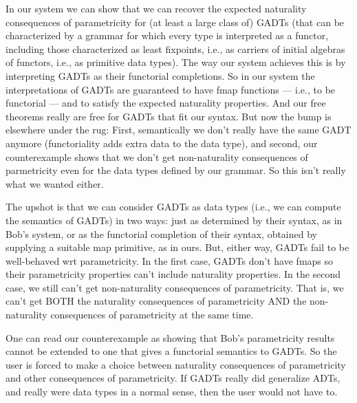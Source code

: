 \documentclass[acmsmall,screen,review,anonymous]{acmart}
\theoremstyle{definition}
\begin{document}
In our system we can show that we can recover the expected naturality
consequences of parametricity for (at least a large class of) GADTs
(that can be characterized by a grammar for which every type is
interpreted as a functor, including those characterized as least
fixpoints, i.e., as carriers of initial algebras of functors, i.e., as
primitive data types). The way our system achieves this is by
interpreting GADTs as their functorial completions. So in our system
the interpretations of GADTs are guaranteed to have fmap functions ---
i.e., to be functorial --- and to satisfy the expected naturality
properties. And our free theorems really are free for GADTs that fit
our syntax. But now the bump is elsewhere under the rug: First,
semantically we don't really have the same GADT anymore (functoriality
adds extra data to the data type), and second, our counterexample
shows that we don't get non-naturality consequences of parmetricity
even for the data types defined by our grammar.  So this isn't really
what we wanted either.


The upshot is that we can consider GADTs as data types (i.e., we can
compute the semantics of GADTs) in two ways: just as determined by
their syntax, as in Bob's system, or as the functorial completion of
their syntax, obtained by supplying a suitable map primitive, as in
ours. But, either way, GADTs fail to be well-behaved wrt
parametricity. In the first case, GADTs don't have fmaps so their
parametricity properties can't include naturality properties. In the
second case, we still can't get non-naturality consequences of
parametricity. That is, we can't get BOTH the naturality consequences
of parametricity AND the non-naturality consequences of parametricity
at the same time.

One can read our counterexample as showing that Bob's parametricity
results cannot be extended to one that gives a functorial semantics to
GADTs. So the user is forced to make a choice between naturality
consequences of parametricity and other consequences of
parametricity. If GADTs really did generalize ADTs, and really were
data types in a normal sense, then the user would not have to.








\end{document}
